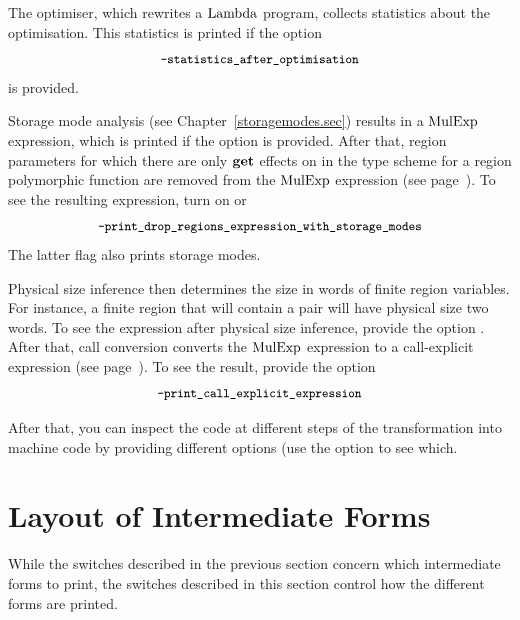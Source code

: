 \documentclass[12pt]{book}
\begin{document}
The optimiser, which rewrites a $\hbox{\rm Lambda}$ program, collects
statistics about the optimisation. This statistics is printed if the
option $$\mbox{\small\ttfamily-statistics\_after\_optimisation}$$ %
%
%
%
%
is provided.

Storage mode analysis (see Chapter~\ref{storagemodes.sec}) results in
a $\hbox{\rm MulExp}$ expression, which is printed if the option
%
%
%
 is provided.  After that, region parameters
for which there are only $\mathop{\bf get}\nolimits$ effects on in the type scheme for a
region polymorphic function are removed from the $\hbox{\rm MulExp}$ expression
(see page~\pageref{bother-to-distinguish-get-n-put}).  To see the
resulting expression, turn on
%
%
%
 or
$$\mbox{\small\ttfamily-print\_drop\_regions\_expression\_with\_storage\_modes}$$
The latter flag also prints storage modes.

%
%
%
Physical size inference then determines the size in words of finite region
variables.  For instance, a finite region that will contain a pair will have
physical size two words.  To see the expression after physical size inference,
provide the option
%
%
%
.  After that,
%
%
%
call conversion converts the $\hbox{\rm MulExp}$ expression to a
%
%
%
call-explicit expression (see page~\pageref{call-explicit}).  To see the result,
provide the option
$$\mbox{\small\ttfamily-print\_call\_explicit\_expression}$$

After that, you can inspect the code at different steps of the transformation
into machine code by providing different options (use the  option to
see which.

\section{Layout of Intermediate Forms}
\label{layout_intermediate_forms.sec}

While the switches described in the previous section concern which intermediate
forms to print, the switches described in this section
%
%
%
control how the different forms are printed.
\end{document}
